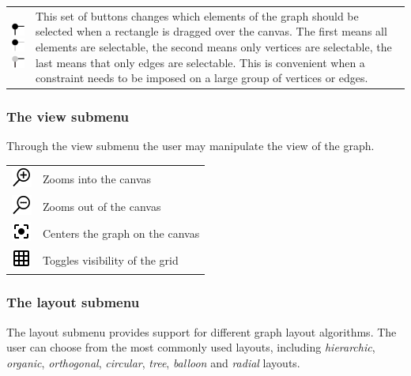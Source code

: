 \begin{tabular}{p{}p{}}
\includegraphics[scale=0.6]{figures/icons/marquee_all.png}  \includegraphics[scale=0.6]{figures/icons/marquee_nodes.png}  \includegraphics[scale=0.6]{figures/icons/marquee_edges.png} & This set of buttons changes which elements of the graph should be selected when a rectangle is dragged over the canvas. The first means all elements are selectable, the second means only vertices are selectable, the last means that only edges are selectable. This is convenient when a constraint needs to be imposed on a large group of vertices or edges.
\end{tabular}
\subsubsection{The view submenu}
Through the view submenu the user may manipulate the view of the graph.
\begin{tabular}{p{}p{}}
\includegraphics[scale=0.6]{figures/icons/zoomin.png} &  Zooms into the canvas\\
\includegraphics[scale=0.6]{figures/icons/zoomout.png}&  Zooms out of the canvas\\
\includegraphics[scale=0.6]{figures/icons/focus.png} & Centers the graph on the canvas\\
\includegraphics[scale=0.6]{figures/icons/grid.png} & Toggles visibility of the grid
\end{tabular}
\subsubsection{The layout submenu}
The layout submenu provides support for different graph layout algorithms. The user can choose from the most commonly used layouts, including \textit{hierarchic}, \textit{organic}, \textit{orthogonal}, \textit{circular}, \textit{tree}, \textit{balloon} and \textit{radial} layouts.
